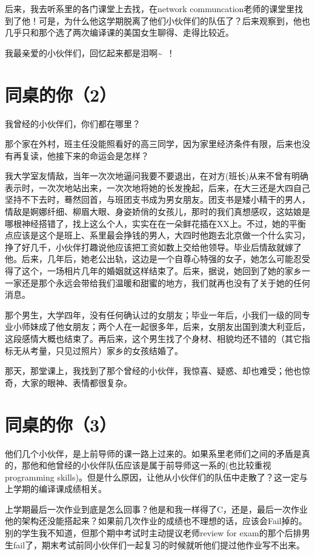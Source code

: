 \documentclass[12pt]{book}
\begin{document}
后来，我去听系里的各门课堂上去找，在network communcation老师的课堂里找到了他！可是，为什么他这学期脱离了他们小伙伴们的队伍了？后来观察到，他也几乎只和那个选了两次编译课的美国女生聊得、走得比较近。

我最亲爱的小伙伴们，回忆起来都是泪啊\textasciitilde{}~！

\section{同桌的你（2）}
\label{sec-23-2}

我曾经的小伙伴们，你们都在哪里？

那个家在外村，班主任没能照看好的高三同学，因为家里经济条件有限，后来也没有再复读，他接下来的命运会是怎样？

我大学室友情敌，当年一次次地逼问我要不要退出，在对方(班长)从来不曾有明确表示时，一次次地站出来，一次次地将她的长发挽起，后来，在大三还是大四自己坚持不下去时，蓦然回首，与班团支书成为男女朋友。团支书是矮小精干的男人，情敌是婀娜纤细、柳眉大眼、身姿娇俏的女孩儿，那时的我们真想感叹，这姑娘是哪根神经搭错了，找上这么个人，实实在在一朵鲜花插在XX上。不过，她的平衡点应该是这个是班上、系里最会挣钱的男人，大四时他跑去北京做一个什么实习，挣了好几千，小伙伴打趣说他应该把工资如数上交给他领导。毕业后情敌就嫁了他。后来，几年后，她老公出轨，这边是一个自尊心特强的女子，她怎么可能忍受得了这个，一场相片几年的婚姻就这样结束了。后来，据说，她回到了她的家乡一一家还是那个永远会带给我们温暖和甜蜜的地方，我们就再也没有了关于她的任何消息。

那个男生，大学四年，没有任何确认过的女朋友；毕业一年后，小我们一级的同专业小师妹成了他女朋友；两个人在一起很多年，后来，女朋友出国到澳大利亚后，这段感情大概也结束了。再后来，这个男生找了个身材、相貌均还不错的（其它指标无从考量，只见过照片）家乡的女孩结婚了。

那天，那堂课上，我找到了那个曾经的小伙伴，我惊喜、疑惑、却也难受；他也惊奇，大家的眼神、表情都很复杂。

\section{同桌的你（3）}
\label{sec-23-3}

他们几个小伙伴，是上前导师的课一路上过来的。如果系里老师们之间的矛盾是真的，那他和他曾经的小伙伴队伍应该是属于前导师这一系的(也比较重视programming skills)。但是什么原因，让他从小伙伴们的队伍中走散了？这一定与上学期的编译课成绩相关。

上学期最后一次作业到底是怎么回事？他是和我一样得了C，还是，最后一次作业他的架构还没能搭起来？如果前几次作业的成绩也不理想的话，应该会Fail掉的。别的学生我不知道，但那个期中考试时主动提议老师review for exam的那个后排男生fail了，期末考试前同小伙伴们一起复习的时候就听他们提过他作业写不出来。
\end{document}
